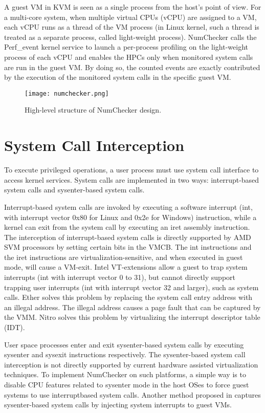 \documentclass[12pt]{report}
\begin{document}
A guest VM in KVM is seen as a single process from the
host’s point of view. For a multi-core system, when multiple
virtual CPUs (vCPU) are assigned to a VM, each vCPU runs
as a thread of the VM process (in Linux kernel, such a thread
is treated as a separate process, called light-weight process).
NumChecker calls the Perf\_event kernel service to launch a
per-process profiling on the light-weight process of each vCPU
and enables the HPCs only when monitored system calls are
run in the guest VM. By doing so, the counted events are
exactly contributed by the execution of the monitored system
calls in the specific guest VM.

\begin{figure}[h]
\centering
\texttt{[image: numchecker.png]}
\caption{High-level structure of NumChecker design.}
\end{figure}
 
 \section{System Call Interception}
 To execute privileged operations, a user process must use
system call interface to access kernel services. System calls
are implemented in two ways: interrupt-based system calls and
sysenter-based system calls.

Interrupt-based system calls are invoked by executing a
software interrupt (int, with interrupt vector 0x80 for Linux
and 0x2e for Windows) instruction, while a kernel can
exit from the system call by executing an iret assembly
instruction. The interception of interrupt-based system calls
is directly supported by AMD SVM processors by setting
certain bits in the VMCB. The int instructions and the iret
instructions are virtualization-sensitive, and when executed in
guest mode, will cause a VM-exit. Intel VT-extensions allow
a guest to trap system interrupts (int with interrupt vector
0 to 31), but cannot directly support trapping user interrupts
(int with interrupt vector 32 and larger), such as system
calls. Ether solves this problem by replacing the system
call entry address with an illegal address. The illegal address
causes a page fault that can be captured by the VMM. Nitro
solves this problem by virtualizing the interrupt descriptor
table (IDT).

User space processes enter and exit sysenter-based system
calls by executing sysenter and sysexit instructions
respectively. The sysenter-based system call interception is not
directly supported by current hardware assisted virtualization
techniques. To implement NumChecker on such platforms,
a simple way is to disable CPU features related to sysenter
mode in the host OSes to force guest systems to use interruptbased
system calls. Another method proposed in captures
sysenter-based system calls by injecting system interrupts to
guest VMs.
\end{document}
